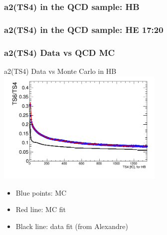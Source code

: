 \documentclass[bigger]{beamer}
\begin{document}
\begin{frame}
\frametitle{a2(TS4) in the QCD sample: HB}
\label{sec-3-5-2}
\label{sec-3-5-2-1}

\begin{center}
\resizebox*{!}{0.75\textheight}{

}
\end{center}
\end{frame}
\begin{frame}
\frametitle{a2(TS4) in the QCD sample: HE 17:20}
\label{sec-3-5-3}
\label{sec-3-5-3-1}

\begin{center}
\resizebox*{!}{0.75\textheight}{

}
\end{center}
\end{frame}
\begin{frame}
\frametitle{a2(TS4) Data vs QCD MC}
\label{sec-3-5-4}
\label{sec-3-5-4-1}

\centering
a2(TS4) Data vs Monte Carlo in HB
\includegraphics[width=0.6\textwidth]{fig/a2_ring0_daata.png}
\label{sec-3-5-4-2}
\begin{itemize}

\item Blue points: MC
\label{sec-3-5-4-2-1}%

\item Red line: MC fit
\label{sec-3-5-4-2-2}%

\item Black line: data fit (from Alexandre)
\label{sec-3-5-4-2-3}%
\end{itemize} %
\end{frame}
\end{document}
